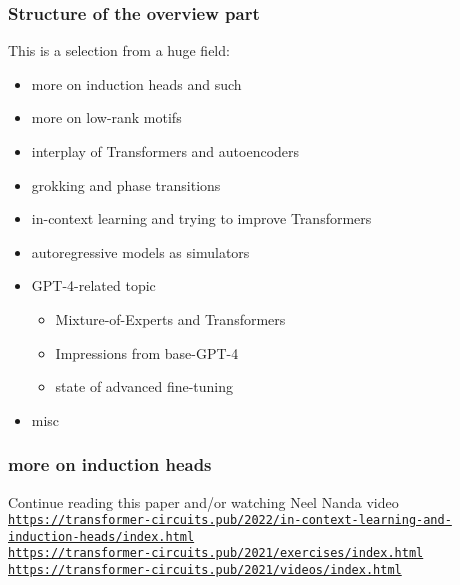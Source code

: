 \documentclass{beamer}
\begin{document}
\begin{frame}

  \frametitle{Structure of the overview part}

This is a selection from a huge field:\\[2ex]

\begin{itemize}
  \item more on induction heads and such
  \item more on low-rank motifs
  \item interplay of Transformers and autoencoders
  \item grokking and phase transitions
  \item in-context learning and trying to improve Transformers
  \item autoregressive models as simulators
  \item GPT-4-related topic
      \begin{itemize}
          \item Mixture-of-Experts and Transformers
          \item Impressions from base-GPT-4
          \item state of advanced fine-tuning
      \end{itemize}
   \item misc
\end{itemize}


\end{frame}

\begin{frame}

  \frametitle{more on induction heads}

Continue reading this paper and/or watching Neel Nanda video\\[2ex]

\href{https://transformer-circuits.pub/2022/in-context-learning-and-induction-heads/index.html}{\tt\tiny https://transformer-circuits.pub/2022/in-context-learning-and-induction-heads/index.html}\\[2ex]

\href{https://transformer-circuits.pub/2021/exercises/index.html}{\tt\small https://transformer-circuits.pub/2021/exercises/index.html}\\[2ex]

\href{https://transformer-circuits.pub/2021/videos/index.html}{\tt\small https://transformer-circuits.pub/2021/videos/index.html}

\end{frame}
\end{document}
